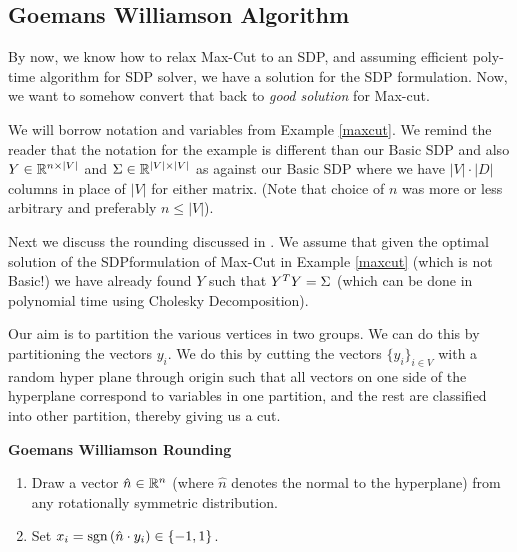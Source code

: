 \subsection{Goemans Williamson Algorithm}
By now, we know how to relax Max-Cut to an SDP, and assuming efficient poly-time algorithm for SDP solver, we have a solution for the SDP formulation. Now, we want to somehow convert that back to \textit{good solution} for Max-cut. 

We will borrow notation and variables from Example \ref{maxcut}. We remind the reader that the notation for the example is different than our Basic SDP and also $Y \in \mathbb{R}^{n \times |V|}$ and $\Sigma \in \mathbb{R}^{|V| \times |V|}$ as against our Basic SDP where we have $|V| \cdot |D|$ columns in place of $|V|$ for either matrix. (Note that choice of $n$ was more or less arbitrary and preferably $n \leq |V|$). 

Next we discuss the rounding discussed in \cite{gwFirstMaxCutSDP}. We assume that given the optimal solution of the SDPformulation of  Max-Cut  in  Example \ref{maxcut}  (which is not Basic!) we have already found $Y$ such that $Y^T Y = \Sigma$ (which can be done in polynomial time using Cholesky Decomposition).

Our aim is to partition the various vertices in two groups. We can do this by partitioning the vectors $y_i$. We do this by cutting the vectors $\{y_i\}_{i \in V}$ with a random hyper plane through origin such that all vectors on one side of the hyperplane correspond to variables in one partition, and the rest are classified into other partition, thereby giving us a cut. 

\begin{algorithm}\textbf{Goemans Williamson Rounding}
\begin{enumerate}
\item Draw a vector $\hat{n} \in \mathbb{R}^n$ (where $\hat{n}$ denotes the normal to the hyperplane) from any rotationally symmetric distribution. 
\item Set $x_i = \mbox{sgn}\left(\hat{n} \cdot y_i\right) \in \{-1, 1 \}$.
\end{enumerate}
\end{algorithm}

